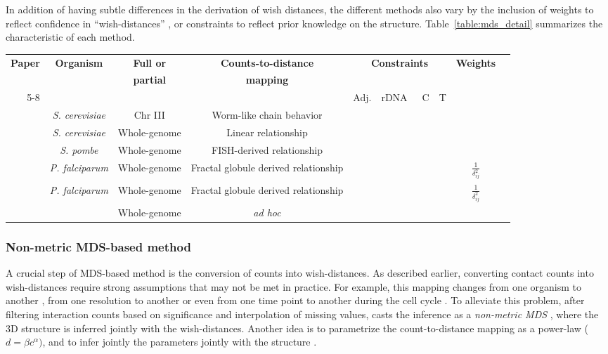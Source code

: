 \documentclass[letterpaper,12pt]{article}
\newcommand*\CHECK{\ding{51}}
\begin{document}
In addition of having subtle differences in the derivation of wish distances,
the different methods also vary by the inclusion of weights to reflect
confidence in ``wish-distances'' \citep{ay:three-dimensional}, or constraints
to reflect prior knowledge on the structure. Table~\ref{table:mds_detail}
summarizes the characteristic of each method.

\begin{table*}
\scriptsize
\centering
\begin{tabular}{rccccccccc}
\hline
\multirow{2}{*}{\textbf{Paper}} & \multirow{2}{*}{\textbf{Organism}} &
\textbf{Full or}
& \textbf{Counts-to-distance} &
\multicolumn{4}{c}{\multirow{2}{*}{\textbf{Constraints}}}
& \multirow{2}{*}{\textbf{Weights}}\\
 & & \textbf{partial} & \textbf{mapping} &  \\
 \cmidrule(lr){5-8} 
 & & & & Adj. & rDNA & C & T & \\
\hline
\cite{dekker:capturing} & {\em S. cerevisiae} & Chr III & Worm-like chain
behavior & & & & \\
\cite{duan:three-dimensional} & {\em S. cerevisiae} & Whole-genome & Linear
relationship & \CHECK &  \CHECK & \CHECK &  & \\
\cite{tanizawa:mapping} & {\em S. pombe} & Whole-genome &
FISH-derived relationship & \CHECK & \CHECK & \CHECK & \CHECK &  \\
\cite{ay:three-dimensional} & {\em P. falciparum} & Whole-genome & Fractal
globule derived relationship & \CHECK  & & &
& $\frac{1}{\delta_{ij}^2}$ \\
\cite{peng:sequencing} & {\em P. falciparum} & Whole-genome & Fractal
globule derived relationship & \CHECK  & & &
 & $\frac{1}{\delta_{ij}^2}$ \\
\cite{lesne:3d} & & Whole-genome & \textit{ad hoc} & & & & & \
\end{tabular}
\caption{Differences between MDS-based methods}{}
\label{table:mds_detail}
\end{table*}


\subsubsection*{Non-metric MDS-based method}

A crucial step of MDS-based method is the conversion of counts into
wish-distances. As described earlier, converting contact counts into
wish-distances require strong assumptions that may not be met in practice. For
example, this mapping changes from one organism to another
\citep{fudenberg:higher-order}, from one resolution to another
\citep{zhang:inference} or even from one time point to another during the cell
cycle \citep{le:high-resolution, ay:three-dimensional}. To alleviate this
problem, after filtering interaction counts based on significance and
interpolation of missing values, \citet{ben-elazar:spatial} casts the
inference as a \emph{non-metric MDS} \citep{kruskal:multidimensional}, where
the 3D structure is inferred jointly with the wish-distances. Another idea is
to parametrize the count-to-distance mapping as a power-law ($d = \beta
c^\alpha)$, and to infer jointly the parameters jointly with the structure
\citet{zhang:inference}.
\end{document}
